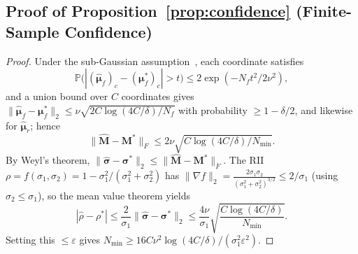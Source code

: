\documentclass[smallextended]{svjour3}       %
\begin{document}
\subsection{Proof of Proposition~\ref{prop:confidence} (Finite-Sample Confidence)}
\label{app:confidence}
\begin{proof}
Under the sub-Gaussian assumption~\cite{vershynin2018high}, each coordinate satisfies
\begin{equation}
\mathbb{P}\bigl(|(\hat{\boldsymbol{\mu}}_f)_c-(\boldsymbol{\mu}_f^*)_c|>t\bigr)\le 2\exp(-N_ft^2/2\nu^2),
\end{equation}
and a union bound over $C$ coordinates gives $\|\hat{\boldsymbol{\mu}}_f-\boldsymbol{\mu}_f^*\|_2\le\nu\sqrt{2C\log(4C/\delta)/N_f}$ with probability $\ge1-\delta/2$, and likewise for $\hat{\boldsymbol{\mu}}_r$; hence
\begin{equation}
\|\hat{\mathbf{M}}-\mathbf{M}^*\|_F\le2\nu\sqrt{C\log(4C/\delta)/N_{\min}}.
\end{equation}
By Weyl's theorem, $\|\hat{\boldsymbol{\sigma}}-\boldsymbol{\sigma}^*\|_2\le\|\hat{\mathbf{M}}-\mathbf{M}^*\|_F$. The RII $\rho=f(\sigma_1,\sigma_2)=1-\sigma_1^2/(\sigma_1^2+\sigma_2^2)$ has $\|\nabla f\|_2=\frac{2\sigma_1\sigma_2}{(\sigma_1^2+\sigma_2^2)^{3/2}}\le2/\sigma_1$ (using $\sigma_2\le\sigma_1$), so the mean value theorem yields
\begin{equation}
|\hat{\rho}-\rho^*|\le\frac{2}{\sigma_1}\|\hat{\boldsymbol{\sigma}}-\boldsymbol{\sigma}^*\|_2\le\frac{4\nu}{\sigma_1}\sqrt{\frac{C\log(4C/\delta)}{N_{\min}}}.
\end{equation}
Setting this $\le\varepsilon$ gives $N_{\min}\ge16C\nu^2\log(4C/\delta)/(\sigma_1^2\varepsilon^2)$.
\end{proof}
\end{document}
